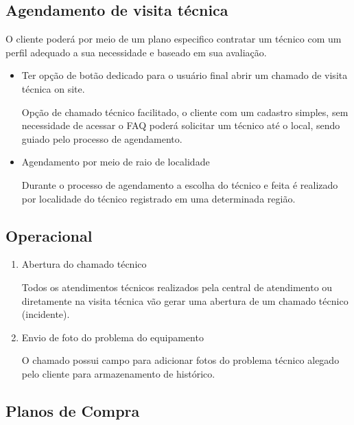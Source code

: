 \documentclass[
    12pt,               %
    openright,          %
    oneside,
    a4paper,            %
    MODELO,             %
    english,            %
    brazil              %
   ]{ifsp-spo-inf-ctds}
\begin{document}
\subsection{Agendamento de visita técnica}

O cliente poderá por meio de um plano especifico contratar um técnico com um perfil adequado a sua necessidade e baseado em sua avaliação.

	\begin{itemize}
	
	        \item Ter opção de botão dedicado para o usuário final abrir um chamado de visita técnica on site.
	        
	        Opção de chamado técnico facilitado, o cliente com um cadastro simples, sem necessidade de acessar o FAQ poderá solicitar um técnico até o local, sendo guiado pelo processo de agendamento.
	        
	        \item Agendamento por meio de raio de localidade
	        
	        Durante o processo de agendamento a escolha do técnico e feita é realizado por localidade do técnico registrado em uma determinada região.
	        
	\end{itemize}

\subsection{Operacional}

	\begin{enumerate}
		
		\item Abertura do chamado técnico
		
		Todos os atendimentos técnicos realizados pela central de atendimento ou diretamente na visita técnica vão gerar uma abertura de um chamado técnico (incidente).
		
		\item Envio de foto do problema do equipamento
		
		O chamado possui campo para adicionar fotos do problema técnico alegado pelo cliente para armazenamento de histórico.
		
	\end{enumerate}

\subsection{Planos de Compra}
\end{document}
